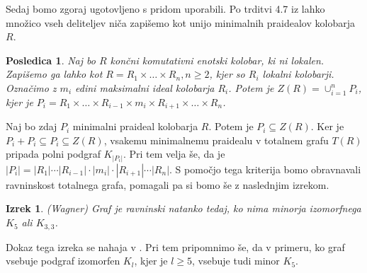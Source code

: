 \documentclass[a4paper, 12pt]{amsart}
\theoremstyle{definition} %
\theoremstyle{plain} %
\newtheorem{izrek}[definicija]{Izrek}
\newtheorem{posledica}[definicija]{Posledica}
\begin{document}
Sedaj bomo zgoraj ugotovljeno s pridom uporabili. Po trditvi 4.7 iz \cite{Atiyah} lahko množico vseh deliteljev niča zapišemo kot unijo minimalnih  praidealov kolobarja $R$.

\begin{posledica}
\label{deliteljiNicaUnijaMinPra}
Naj bo $R$ končni komutativni enotski kolobar, ki ni lokalen. Zapišemo ga lahko kot $R = R_1 \times \dots \times R_n, n\ge2$, kjer so $R_i$ lokalni kolobarji. Označimo z $m_i$ edini maksimalni ideal kolobarja $R_i$. Potem je $Z(R) = \cup_{i=1}^n P_i$, kjer je $P_i = R_1 \times \dots \times R_{i-1} \times m_i \times R_{i+1} \times \dots \times R_n$.
\end{posledica}

Naj bo zdaj $P_i$ minimalni praideal kolobarja $R$. Potem je $P_i \subseteq Z(R)$. Ker je $P_i + P_i \subseteq P_i \subseteq Z(R)$, vsakemu minimalnemu praidealu v totalnem grafu $T(R)$ pripada polni podgraf $K_{|P_i|}$. Pri tem velja še, da je $|P_i| = |R_1|\cdots |R_{i-1}| \cdot |m_i| \cdot |R_{i+1}| \cdots |R_n|$.
S pomočjo tega kriterija bomo obravnavali ravninskost totalnega grafa, pomagali pa si bomo še z naslednjim izrekom.

\begin{izrek}(Wagner)
Graf je ravninski natanko tedaj, ko nima minorja izomorfnega $K_5$ ali $K_{3,3}$.
\end{izrek}
Dokaz tega izreka se nahaja v \cite[Theorem 4.2.9]{Diestel}. Pri tem pripomnimo še, da v primeru, ko graf vsebuje podgraf izomorfen $K_l$, kjer je $l\ge5$, vsebuje tudi minor $K_5$.
\end{document}

